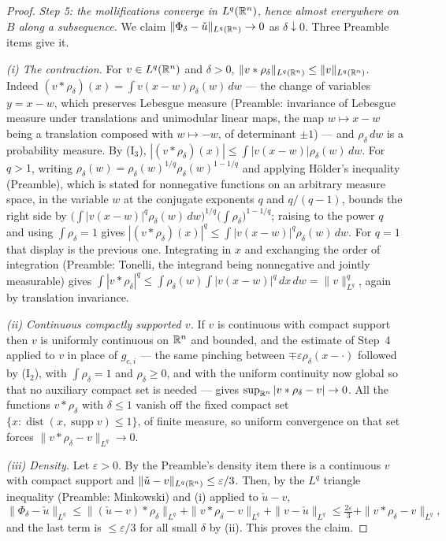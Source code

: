 \begin{proof}
\medskip
\noindent\emph{Step 5: the mollifications converge in $L^{q}(\mathbb{R}^n)$, hence
almost everywhere on $B$ along a subsequence.}  We claim
$\|\Phi_\delta-\check u\|_{L^q(\mathbb{R}^n)}\to0$ as $\delta\downarrow0$.  Three
Preamble items give it.

\emph{(i) The contraction.}  For $v\in L^q(\mathbb{R}^n)$ and $\delta>0$,
$\|v*\rho_\delta\|_{L^q(\mathbb{R}^n)}\le\|v\|_{L^q(\mathbb{R}^n)}$.  Indeed
$(v*\rho_\delta)(x)=\int v(x-w)\rho_\delta(w)\,dw$ --- the change of variables
$y=x-w$, which preserves Lebesgue measure (Preamble: invariance of Lebesgue
measure under translations and unimodular linear maps, the map $w\mapsto x-w$
being a translation composed with $w\mapsto-w$, of determinant $\pm1$) --- and
$\rho_\delta\,dw$ is a probability measure.  By ($\mathrm I_3$),
$|(v*\rho_\delta)(x)|\le\int|v(x-w)|\rho_\delta(w)\,dw$.  For $q>1$, writing
$\rho_\delta(w)=\rho_\delta(w)^{1/q}\rho_\delta(w)^{1-1/q}$ and applying
H\"older's inequality (Preamble), which is stated for nonnegative functions on
an arbitrary measure space, in the variable $w$ at the conjugate exponents $q$
and $q/(q-1)$, bounds the right side by
$\bigl(\int|v(x-w)|^q\rho_\delta(w)\,dw\bigr)^{1/q}\bigl(\int\rho_\delta\bigr)^{1-1/q}$;
raising to the power $q$ and using $\int\rho_\delta=1$ gives
$|(v*\rho_\delta)(x)|^q\le\int|v(x-w)|^q\rho_\delta(w)\,dw$.  For $q=1$ that
display is the previous one.  Integrating in $x$ and exchanging the order
of integration (Preamble: Tonelli, the integrand being nonnegative and jointly
measurable) gives
$\int|v*\rho_\delta|^q\le\int\rho_\delta(w)\int|v(x-w)|^q\,dx\,dw
=\|v\|^q_{L^q}$, again by translation invariance.

\emph{(ii) Continuous compactly supported $v$.}  If $v$ is continuous with
compact support then $v$ is uniformly continuous on $\mathbb{R}^n$ and bounded, and the
estimate of Step~4 applied to $v$ in place of $g_{c,i}$ --- the same pinching
between $\mp\varepsilon\rho_\delta(x-\cdot)$ followed by ($\mathrm I_2$), with
$\int\rho_\delta=1$ and $\rho_\delta\ge0$, and with the uniform continuity now
global so that no auxiliary compact set is needed --- gives
$\sup_{\mathbb{R}^n}|v*\rho_\delta-v|\to0$.  All the functions $v*\rho_\delta$ with
$\delta\le1$ vanish off the fixed compact set
$\{x:\operatorname{dist}(x,\operatorname{supp}v)\le1\}$, of finite measure, so
uniform convergence on that set forces $\|v*\rho_\delta-v\|_{L^q}\to0$.

\emph{(iii) Density.}  Let $\varepsilon>0$.  By the Preamble's density item
there is a continuous $v$ with compact support and
$\|\check u-v\|_{L^q(\mathbb{R}^n)}\le\varepsilon/3$.  Then, by the $L^q$ triangle
inequality (Preamble: Minkowski) and (i) applied to $\check u-v$,
\[
\|\Phi_\delta-\check u\|_{L^q}
\le\|(\check u-v)*\rho_\delta\|_{L^q}+\|v*\rho_\delta-v\|_{L^q}
+\|v-\check u\|_{L^q}
\le\tfrac{2\varepsilon}3+\|v*\rho_\delta-v\|_{L^q},
\]
and the last term is $\le\varepsilon/3$ for all small $\delta$ by (ii).  This
proves the claim.


\end{proof}
